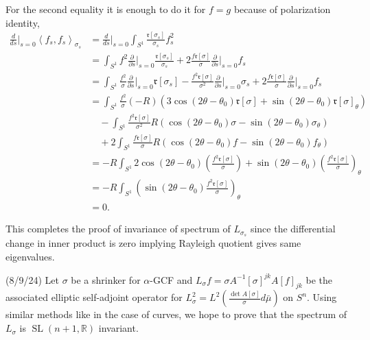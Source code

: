 \documentclass[12pt,a4paper]{article}
\newcommand{\R}{\mathbb{R}}
\begin{document}
For the second equality it is enough to do it for $ f=g $ because of polarization identity,\begin{align*}
   \frac{d}{ds}\bigg|_{s=0} \left< f_{s}, f_{s} \right>_{\sigma_{s}} & = \frac{d}{ds}\bigg|_{s=0} \int_{S^{1}} \frac{ \mathfrak{r}[\sigma_{s}]}{\sigma_{s}}f_{s}^{2} \\
   & = \int_{S^{1}} f^{2}\frac{\partial}{\partial s}\bigg|_{s=0}\frac{ \mathfrak{r}[\sigma_{s}]}{\sigma_{s}} + 2\frac{f \mathfrak{r}[\sigma]}{\sigma}  \frac{\partial}{\partial s}\bigg|_{s=0}f_{s} \\
   & = \int_{S^{1}} \frac{f^{2}}{\sigma}\frac{\partial}{\partial s}\bigg|_{s=0} \mathfrak{r}[\sigma_{s}] - \frac{f^{2}\mathfrak{r}[\sigma]}{\sigma^{2}} \frac{\partial}{\partial s}\bigg|_{s=0} \sigma_{s} + 2\frac{f \mathfrak{r}[\sigma]}{\sigma}  \frac{\partial}{\partial s}\bigg|_{s=0}f_{s} \\
   & = \int_{S^{1}} \frac{f^{2}}{\sigma}(-R)(3\cos(2 \theta- \theta_{0}) \mathfrak{r}[\sigma] + \sin(2 \theta- \theta_{0}) \mathfrak{r}[\sigma]_{\theta}) \\
   & \quad -\int_{S^{1}} \frac{f^{2} \mathfrak{r}[\sigma]}{\sigma^{2}}R(\cos(2 \theta-\theta_{0})\sigma - \sin(2 \theta-\theta_{0})\sigma_{\theta}) \\
   & \quad + 2 \int_{S^{1}} \frac{f \mathfrak{r}[\sigma]}{\sigma}R(\cos(2 \theta - \theta_{0})f -\sin(2 \theta-\theta_{0})f_{\theta}) \\
   & = -R\int_{S^{1}} 2 \cos(2 \theta-\theta_{0}) \left( \frac{f^{2} \mathfrak{r}[\sigma]}{\sigma}\right)  + \sin(2 \theta- \theta_{0}) \left( \frac{f^{2} \mathfrak{r}[\sigma]}{\sigma}\right)_{\theta} \\
   & = - R \int_{S^{1}} \left(\sin(2 \theta-\theta_{0}) \frac{f^{2} \mathfrak{r}[\sigma]}{\sigma}\right)_{\theta} \\
   & = 0. 
\end{align*}

This completes the proof of invariance of spectrum of $ L_{\sigma_{s}} $ since the differential change in inner product is zero implying Rayleigh quotient gives same eigenvalues. 

(8/9/24) Let $ \sigma $ be a shrinker for $ \alpha $-GCF and $ L_{\sigma}f = \sigma A^{-1}[\sigma]^{jk}A[f]_{jk} $ be the associated elliptic self-adjoint operator for $ L^{2}_{\sigma} = L^{2} ( \frac{\det A[\sigma]}{\sigma} d \bar{\mu}) $ on $ S^{n} $. Using similar methods like in the case of curves, we hope to prove that the spectrum of $ L_{\sigma} $ is $ \operatorname{SL}(n+1, \R) $ invariant. 
\end{document}
